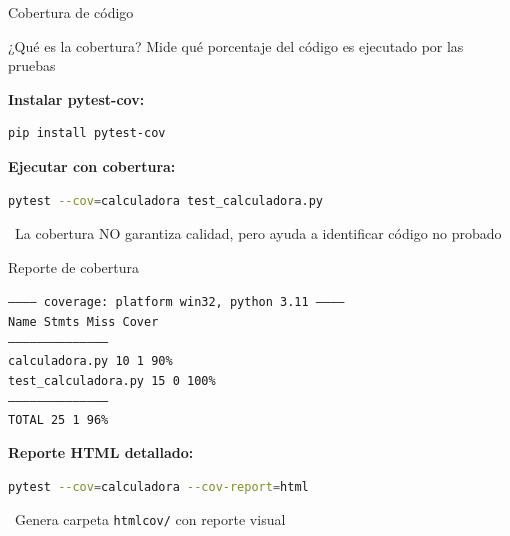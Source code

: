 \documentclass{beamer}
\begin{document}
\begin{frame}[fragile]{Cobertura de código \faChartPie}
\begin{conceptbox}{¿Qué es la cobertura?}
Mide qué porcentaje del código es ejecutado por las pruebas
\end{conceptbox}

\textbf{Instalar pytest-cov:}
\begin{lstlisting}[language=bash, numbers=none]
pip install pytest-cov
\end{lstlisting}

\vspace{0.2cm}
\textbf{Ejecutar con cobertura:}
\begin{lstlisting}[language=bash, numbers=none]
pytest --cov=calculadora test_calculadora.py
\end{lstlisting}

\vspace{-0.1cm}
\begin{notebox}
\small\faInfoCircle\ La cobertura NO garantiza calidad, pero ayuda a identificar código no probado
\end{notebox}
\end{frame}

\begin{frame}[fragile]{Reporte de cobertura \faFileAlt}
\begin{tcolorbox}[colback=blue!10,colframe=blue,title={\small\faChartBar \ Ejemplo de reporte},coltitle=fg0,left=3pt,right=3pt,top=2pt,bottom=2pt,boxsep=1pt]
\small\texttt{----------- coverage: platform win32, python 3.11 -----------\\
Name                  Stmts   Miss  Cover\\
-----------------------------------------\\
calculadora.py           10      1    90\%\\
test\_calculadora.py     15      0   100\%\\
-----------------------------------------\\
TOTAL                    25      1    96\%}
\end{tcolorbox}

\vspace{0.2cm}
\textbf{Reporte HTML detallado:}
\begin{lstlisting}[language=bash, numbers=none]
pytest --cov=calculadora --cov-report=html
\end{lstlisting}

\vspace{-0.1cm}
\begin{notebox}
\small\faLightbulb\ Genera carpeta \texttt{htmlcov/} con reporte visual
\end{notebox}
\end{frame}
\end{document}
